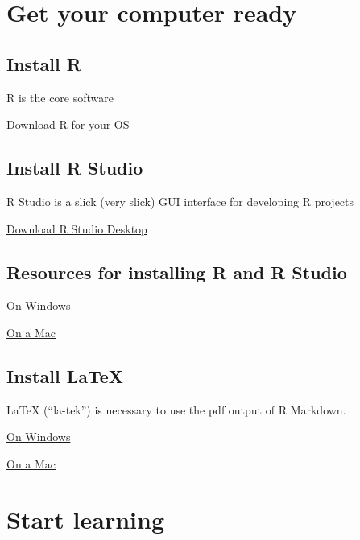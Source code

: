\documentclass[]{book}
\begin{document}
\section{Get your computer ready}\label{get-your-computer-ready}

\subsection{Install R}\label{install-r}

R is the core software

\href{https://cran.r-project.org}{Download R for your OS}

\subsection{Install R Studio}\label{install-r-studio}

R Studio is a slick (very slick) GUI interface for developing R projects

\href{https://www.rstudio.com/products/rstudio/download/}{Download R
Studio Desktop}

\subsection{Resources for installing R and R
Studio}\label{resources-for-installing-r-and-r-studio}

\href{https://medium.com/@GalarnykMichael/install-r-and-rstudio-on-windows-5f503f708027}{On
Windows}

\href{https://medium.com/@GalarnykMichael/install-r-and-rstudio-on-mac-e911606ce4f4}{On
a Mac}

\subsection{Install LaTeX}\label{install-latex}

LaTeX (``la-tek'') is necessary to use the pdf output of R Markdown.

\href{https://medium.com/@sorenlind/create-pdf-reports-using-r-r-markdown-latex-and-knitr-on-windows-10-952b0c48bfa9}{On
Windows}

\href{https://medium.com/@sorenlind/create-pdf-reports-using-r-r-markdown-latex-and-knitr-on-macos-high-sierra-e7b5705c9fd}{On
a Mac}

\section{Start learning}\label{start-learning}
\end{document}
